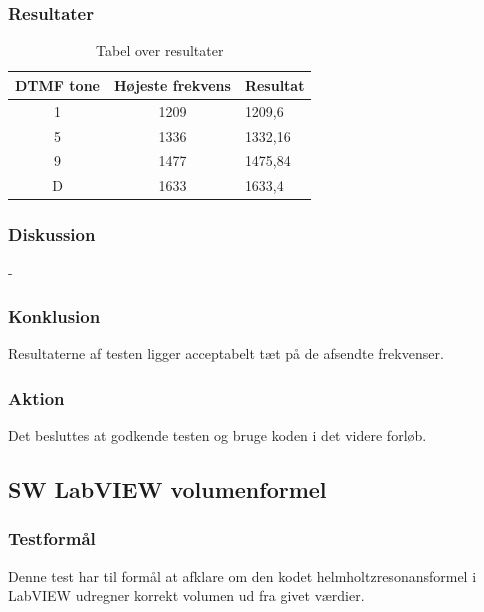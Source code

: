 			
		\subsubsection{Resultater}
		
			\begin{table}[]
				\centering
				\caption{Tabel over resultater}
				\label{SWhelmholtzresultater}
				\begin{tabular}{lll}
					\multicolumn{1}{l|}{\textbf{DTMF tone}} & 	
					\multicolumn{1}{l|}{\textbf{Højeste frekvens}} & \textbf{Resultat} \\ \hline
					\multicolumn{1}{c|}{1}& 
					\multicolumn{1}{c|}{1209}&1209,6\\
					\multicolumn{1}{c|}{5}& 
					\multicolumn{1}{c|}{1336}&1332,16\\
					\multicolumn{1}{c|}{9}& 
					\multicolumn{1}{c|}{1477}&1475,84\\
					\multicolumn{1}{c|}{D}& 
					\multicolumn{1}{c|}{1633}&1633,4\\
                   
				\end{tabular}
			\end{table}
	
		\subsubsection{Diskussion} 
		
		-
	
		\subsubsection{Konklusion}
		 
	Resultaterne af testen ligger acceptabelt tæt på de afsendte frekvenser. 
	
	    \subsubsection{Aktion}
	    Det besluttes at godkende testen og bruge koden i det videre forløb. 

\subsection{SW LabVIEW volumenformel}	
\subsubsection{Testformål}
		Denne test har til formål at afklare om den kodet helmholtzresonansformel i LabVIEW udregner korrekt volumen ud fra givet værdier. 
